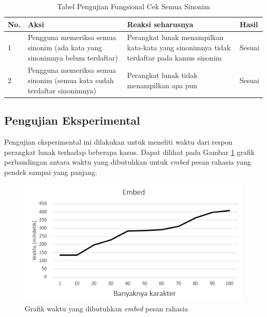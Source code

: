 \begin{table}[H]
\label{table-fungsional-cek-sinonim}
\centering
\caption{Tabel Pengujian Fungsional Cek Semua Sinonim}
\begin{tabular}{|p{0.3cm} | p{4.5cm} | p{7cm} | p{2.5cm} |}\hline
No. & Aksi & Reaksi seharusnya & Hasil \\
\hline
1 & Pengguna memeriksa semua sinonim (ada kata yang sinonimnya belum terdaftar) & Perangkat lunak menampilkan kata-kata yang sinonimnya tidak terdaftar pada kamus sinonim & Sesuai\\
\hline
2 & Pengguna memeriksa semua sinonim (semua kata sudah terdaftar sinonimnya) & Perangkat lunak tidak menampilkan apa pun & Sesuai \\
\hline
\end{tabular}
\end{table}

\subsection{Pengujian Eksperimental}
Pengujian eksperimental ini dilakukan untuk meneliti waktu dari respon perangkat lunak terhadap beberapa kasus. Dapat dilihat pada Gambar \ref{fig:graf-embed} grafik perbandingan antara waktu yang dibutuhkan untuk \textit{embed} pesan rahasia yang pendek sampai yang panjang.

\begin{figure}[H]
	\centering
	\includegraphics[scale=0.8]{Gambar/graf-embed}
	\caption{Grafik waktu yang dibutuhkan \textit{embed} pesan rahasia} 
	\label{fig:graf-embed}
\end{figure}

